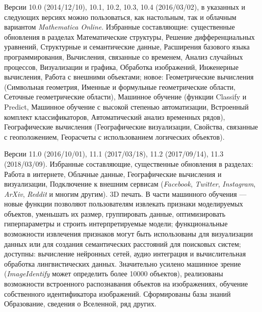 \begin{textitemize}
	\item Версии 10.0 (2014/12/10), 10.1, 10.2, 10.3, 10.4 (2016/03/02), в указанных и следующих версиях можно пользоваться, как настольным, так и облачным вариантом \textit{Mathematica Online}. Избранные составляющие: существенные обновления в разделах Математические структуры, Решение дифференциальных уравнений, Структурные и семантические данные, Расширения базового языка программирования, Вычисления, связанные со временем, Анализ случайных процессов, Визуализации и графика, Обработка изображений, Инженерные вычисления, Работа с внешними объектами; новое: Геометрические вычисления (Символьная геометрия, Именные и формульные геометрические области, Сеточные геометрические области), Машинное обучение (функции Classify и Predict, Машинное обучение с высокой степенью автоматизации, Встроенный комплект классификаторов, Автоматический анализ временных рядов), Географические вычисления (Географические визуализации, Свойства, связанные с геоположением, Георасчеты с использованием логических объектов).
	\item Версии 11.0 (2016/10/01), 11.1 (2017/03/18), 11.2 (2017/09/14), 11.3 (2018/03/09). Избранные составляющие, существенные обновления в разделах: Работа в интернете, Облачные данные, Географические вычисления и визуализации, Подключение к внешним сервисам (\textit{Facebook}, \textit{Twitter}, \textit{Instagram}, \textit{ArXiv}, \textit{Reddit} и многим другим). 3D печать. В части машинного обучения --- новые функции позволяют пользователям извлекать признаки моделируемых объектов, уменьшать их размер, группировать данные, оптимизировать гиперпараметры и строить интерпретируемые модели; функциональные возможности извлечения признаков могут быть использованы для визуализации данных или для создания семантических расстояний для поисковых систем; доступны: вычисление нейронных сетей, аудио интеграция и вычислительная обработка лингвистических данных. Значительно усилено машинное зрение (\textit{ImageIdentify} может определить более 10000 объектов), реализованы возможности встроенного распознавания объектов на изображениях, обучение собственного идентификатора изображений. Сформированы базы знаний Образование, сведения о Вселенной, ряд других. 

\end{textitemize}
